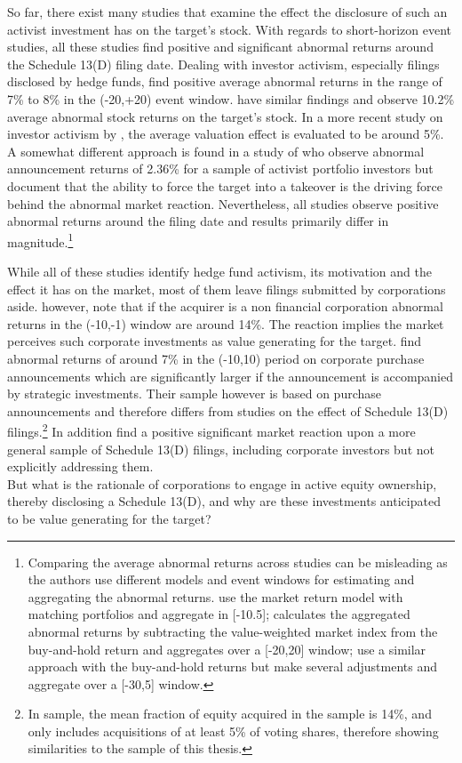 \documentclass[12pt]{article}
\begin{document}
So far, there exist many studies that examine the effect the disclosure of such an activist investment has on the target's stock. With regards to short-horizon event studies, all these studies find positive and significant abnormal returns around the Schedule 13(D) filing date. 
Dealing with investor activism, especially filings disclosed by hedge funds, \citet[p.1730]{Brav2008} find positive average abnormal returns in the range of 7\% to 8\% in the (-20,+20) event window. \citet[p.188]{Klein2009} have similar findings and observe 10.2\% average abnormal stock returns on the target's stock. In a more recent study on investor activism by \citet[p.410]{Denes2017}, the average valuation effect is evaluated to be around 5\%. A somewhat different approach is found in a study of \citet[p.363]{Greenwood2009} who observe abnormal announcement returns of 2.36\% for a sample of activist portfolio investors but document that the ability to force the target into a takeover is the driving force behind the abnormal market reaction. Nevertheless, all studies observe positive abnormal returns around the filing date and results primarily differ in magnitude.\footnote{Comparing the average abnormal returns across studies can be misleading as the authors use different models and event windows for estimating and aggregating the abnormal returns. \citet{Greenwood2009} use the market return model with matching portfolios and aggregate in [-10.5]; \citet{Brav2008} calculates the aggregated abnormal returns by subtracting the value-weighted market index from the buy-and-hold return and aggregates over a [-20,20] window; \citet{Klein2009} use a similar approach with the buy-and-hold returns but make several adjustments and aggregate over a [-30,5] window.}

While all of these studies identify hedge fund activism, its motivation and the effect it has on the market, most of them leave filings submitted by corporations aside. \citet[p.29]{Brigida2012} however, note that if the acquirer is a non financial corporation abnormal returns in the (-10,-1) window are around 14\%. The reaction implies the market perceives such corporate investments as value generating for the target. \citet[p.2803]{Allen2000} find abnormal returns of around 7\% in the (-10,10) period on corporate purchase announcements which are significantly larger if the announcement is accompanied by strategic investments. Their sample however is based on purchase announcements and therefore differs from studies on the effect of Schedule 13(D) filings.\footnote{In \citet[p.2801]{Allen2000} sample, the mean fraction of equity acquired in the sample is 14\%, and  only includes acquisitions of at least 5\% of voting shares, therefore showing similarities to the sample of this thesis.} In addition \citet{Collin-Dufresne2015} find a positive significant market reaction upon a more general sample of Schedule 13(D) filings, including corporate investors but not explicitly addressing them.\\
But what is the rationale of corporations to engage in active equity ownership, thereby disclosing a Schedule 13(D), and why are these investments anticipated to be value generating for the target?
\end{document}
